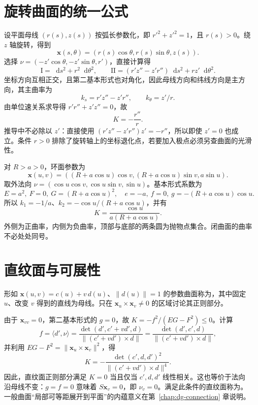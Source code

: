 \documentclass[UTF8,12pt,a4paper,fontset=fandol]{ctexbook}
\newcommand{\dd}{\mathop{}\!\mathrm d}
\newcommand{\ip}[2]{\langle #1,#2\rangle}
\newcommand{\norm}[1]{\lVert #1\rVert}
\begin{document}
\section{旋转曲面的统一公式}
设平面母线 $(r(s),z(s))$ 按弧长参数化，即 $r'^2+z'^2=1$，且 $r(s)>0$。绕 $z$ 轴旋转，得到
\[
 \mathbf x(s,\theta)=(r(s)\cos\theta,r(s)\sin\theta,z(s)).
\]
选择 $\nu=(-z'\cos\theta,-z'\sin\theta,r')$，直接计算得
\begin{equation}
 \mathrm I=\dd s^2+r^2\dd\theta^2,\qquad
 \mathrm{II}=(r'z''-z'r'')\dd s^2+rz'\dd\theta^2.
 \label{eq:dg-revolution-forms}
\end{equation}
坐标方向互相正交，且第二基本形式也对角化，因此母线方向和纬线方向是主方向，其主曲率为
\[
 k_s=r'z''-z'r'',\qquad k_\theta=z'/r.
\]
由单位速关系求导得 $r'r''+z'z''=0$，故
\begin{equation}
 K=-\frac{r''}{r}.
 \label{eq:dg-revolution-K}
\end{equation}
推导中不必除以 $z'$：直接使用 $(r'z''-z'r'')z'=-r''$，所以即使 $z'=0$ 也成立。条件 $r>0$ 排除了旋转轴上的坐标退化点，若要加入极点必须另查曲面的光滑性。

\begin{example}[环面的正负曲率]\label{exam:dg-torus}
对 $R>a>0$，环面参数为
\[
 \mathbf x(u,v)=((R+a\cos u)\cos v,(R+a\cos u)\sin v,a\sin u).
\]
取外法向 $\nu=(\cos u\cos v,\cos u\sin v,\sin u)$。基本形式系数为
\[
 E=a^2,\ F=0,\ G=(R+a\cos u)^2,\quad
 e=-a,\ f=0,\ g=-(R+a\cos u)\cos u.
\]
所以 $k_1=-1/a$、$k_2=-\cos u/(R+a\cos u)$，并有
\[
 K=\frac{\cos u}{a(R+a\cos u)}.
\]
外侧为正曲率，内侧为负曲率，顶部与底部的两条圆为抛物点集合。闭曲面的曲率不必处处同号。
\end{example}

\section{直纹面与可展性}
\begin{definition}[直纹面]
形如 $\mathbf x(u,v)=c(u)+v\,d(u)$、$\norm{d(u)}=1$ 的参数曲面称为，其中固定 $u$、改变 $v$ 得到的直线为母线。只在 $\mathbf x_u\times\mathbf x_v\ne0$ 的区域讨论其正则部分。
\end{definition}
由于 $\mathbf x_{vv}=0$，第二基本形式的 $g=0$，故 $K=-f^2/(EG-F^2)\le0$。计算
\[
 f=\ip{d'}\nu
 =\frac{\det(d',c'+vd',d)}{\norm{(c'+vd')\times d}}
 =\frac{\det(d',c',d)}{\norm{(c'+vd')\times d}},
\]
并利用 $EG-F^2=\norm{\mathbf x_u\times\mathbf x_v}^2$，得
\begin{equation}
 K=-\frac{\det(c',d,d')^2}{\norm{(c'+vd')\times d}^4}.
 \label{eq:dg-ruled-K}
\end{equation}
因此，直纹面正则部分满足 $K=0$ 当且仅当 $c',d,d'$ 线性相关。这也等价于法向沿母线不变：$g=f=0$ 意味着 $S\mathbf x_v=0$，即 $\nu_v=0$。满足此条件的直纹面称为。一般曲面“局部可等距展开到平面”的内蕴意义在第~\ref{chap:dg-connection} 章说明。
\end{document}
